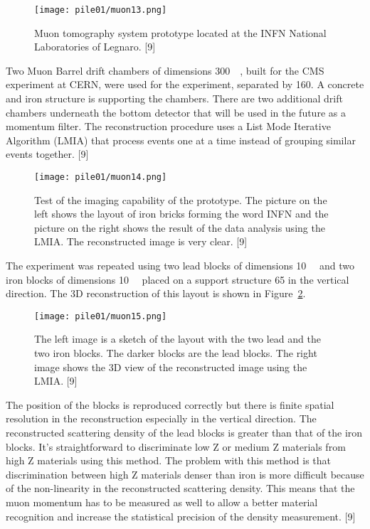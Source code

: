 \documentclass[twoside,titlepage,11pt,twocolumn,a4paper]{article}
\begin{document}
\begin{figure}
  \texttt{[image: pile01/muon13.png]}
  \caption{Muon tomography system prototype located at the INFN
    National Laboratories of Legnaro. [9]}
  \label{fig:muon13}
\end{figure}

Two Muon Barrel drift chambers of dimensions
\unit{300}{\cubic{\centi\metre}}, built for the CMS
experiment at CERN, were used for the experiment, separated by
\unit{160}{\centi\metre}. A concrete and iron structure is supporting
the chambers. There are two additional drift chambers underneath the
bottom detector that will be used in the future as a momentum
filter. The reconstruction procedure uses a List Mode Iterative
Algorithm (LMIA) that process events one at a time instead of grouping
similar events together. [9]

\begin{figure}
  \texttt{[image: pile01/muon14.png]}
  \caption{Test of the imaging capability of the prototype. The
    picture on the left shows the layout of iron bricks forming the
    word INFN and the picture on the right shows the result of the
    data analysis using the LMIA. The reconstructed image is very
    clear. [9]}
\end{figure}

The experiment was repeated using two lead blocks of dimensions
\unit{10}{\cubic{\centi\metre}} and two iron blocks of
dimensions \unit{10}{\cubic{\centi\metre}} placed on a
support structure \unit{65}{\centi\metre} in the vertical
direction. The 3D reconstruction of this layout is shown in
Figure~\ref{fig:muon15}.

\begin{figure}
  \texttt{[image: pile01/muon15.png]}
  \caption{The left image is a sketch of the layout with the two lead
    and the two iron blocks. The darker blocks are the lead
    blocks. The right image shows the 3D view of the reconstructed
    image using the LMIA. [9]}
  \label{fig:muon15}
\end{figure}

The position of the blocks is reproduced correctly but there is finite
spatial resolution in the reconstruction especially in the vertical
direction. The reconstructed scattering density of the lead blocks is
greater than that of the iron blocks. It’s straightforward to
discriminate low Z or medium Z materials from high Z materials using
this method. The problem with this method is that discrimination
between high Z materials denser than iron is more difficult because of
the non-linearity in the reconstructed scattering density. This means
that the muon momentum has to be measured as well to allow a better
material recognition and increase the statistical precision of the
density measurement. [9]
\end{document}
